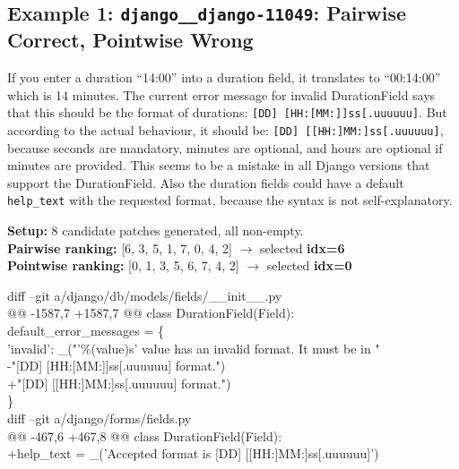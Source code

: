 \subsection{Example 1: \texttt{django\_\_django-11049}: Pairwise Correct, Pointwise Wrong}

\begin{tcolorbox}[
    colback=promptbg,
    colframe=promptborder,
    title={\textbf{Issue: Correct expected format in invalid DurationField error message}},
    coltitle=white,
    fonttitle=\small\bfseries,
    breakable,
    enhanced
]
\small
If you enter a duration ``14:00'' into a duration field, it translates to ``00:14:00'' which is 14 minutes. The current error message for invalid DurationField says that this should be the format of durations: \texttt{[DD] [HH:[MM:]]ss[.uuuuuu]}. But according to the actual behaviour, it should be: \texttt{[DD] [[HH:]MM:]ss[.uuuuuu]}, because seconds are mandatory, minutes are optional, and hours are optional if minutes are provided. This seems to be a mistake in all Django versions that support the DurationField. Also the duration fields could have a default \texttt{help\_text} with the requested format, because the syntax is not self-explanatory.
\end{tcolorbox}

\noindent\textbf{Setup:} 8 candidate patches generated, all non-empty.\\
\textbf{Pairwise ranking:} [6, 3, 5, 1, 7, 0, 4, 2] \quad $\rightarrow$ selected \textbf{idx=6} \checkmark\\
\textbf{Pointwise ranking:} [0, 1, 3, 5, 6, 7, 4, 2] \quad $\rightarrow$ selected \textbf{idx=0} 

\begin{tcolorbox}[
    colback=green!5,
    colframe=green!60!black,
    title={\textbf{Pairwise-Selected Patch (idx=6): Resolves the issue \checkmark}},
    coltitle=white,
    fonttitle=\small\bfseries,
    breakable,
    enhanced
]
\small\ttfamily
diff --git a/django/db/models/fields/\_\_init\_\_.py\\
@@ -1587,7 +1587,7 @@ class DurationField(Field):\\
\quad default\_error\_messages = \{\\
\quad\quad 'invalid': \_("'\%(value)s' value has an invalid format. It must be in "\\
-\quad\quad\quad\quad\quad "[DD] [HH:[MM:]]ss[.uuuuuu] format.")\\
+\quad\quad\quad\quad\quad "[DD] [[HH:]MM:]ss[.uuuuuu] format.")\\
\quad \}\\[0.5em]
diff --git a/django/forms/fields.py\\
@@ -467,6 +467,8 @@ class DurationField(Field):\\
+\quad help\_text = \_('Accepted format is [DD] [[HH:]MM:]ss[.uuuuuu]')
\end{tcolorbox}

